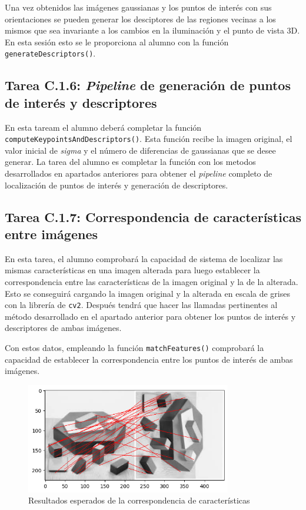 Una vez obtenidos las imágenes gaussianas y los puntos de interés con sus orientaciones se pueden generar los desciptores de las regiones vecinas a los mismos que sea invariante a los cambios en la iluminación y el punto de vista 3D. En esta sesión esto se le proporciona al alumno con la función \texttt{generateDescriptors()}.

\subsection*{Tarea C.1.6: \textit{Pipeline} de generación de puntos de interés y descriptores}

En esta taream el alumno deberá completar la función \texttt{computeKeypointsAndDescriptors()}. Esta función recibe la imagen original, el valor inicial de \textit{sigma} y el número de diferencias de gaussianas que se desee generar. La tarea del alumno es completar la función con los metodos desarrollados en apartados anteriores para obtener el \textit{pipeline} completo de localización de puntos de interés y generación de descriptores.

\subsection*{Tarea C.1.7: Correspondencia de características entre imágenes}

En esta tarea, el alumno comprobará la capacidad de sistema de localizar las mismas características en una imagen alterada para luego establecer la correspondencia entre las características de la imagen original y la de la alterada. Esto se conseguirá cargando la imagen original y la alterada en escala de grises con la librería de \texttt{cv2}. Después tendrá que hacer las llamadas pertinentes al método desarrollado en el apartado anterior para obtener los puntos de interés y descriptores de ambas imágenes. 

Con estos datos, empleando la función \texttt{matchFeatures()} comprobará la capacidad de establecer la correspondencia entre los puntos de interés de ambas imágenes.

\begin{figure}[h]
    \centering
    \includegraphics[width=0.8\textwidth]{Lab_3/template/figures/FeatureMatchMine.png}
    \caption{Resultados esperados de la correspondencia de características}
    \label{fig:FMatchEnd}
\end{figure}

